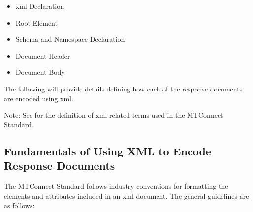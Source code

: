 \documentclass{mtconnect}	%
\begin{document}
\begin{itemize}
\item \gls{xml} Declaration

\item Root Element

\item Schema and Namespace Declaration

\item Document Header

\item Document Body
\end{itemize}

The following will provide details defining how each of the \glspl{response document} are encoded using \gls{xml}.

\begin{note}
Note: See  for the definition of \gls{xml} related terms used in the MTConnect Standard.

\end{note}

\subsection{Fundamentals of Using XML to Encode Response Documents}

The MTConnect Standard follows industry conventions for formatting the elements and attributes included in an \gls{xml} document.  The general guidelines are as follows: 
\end{document}
